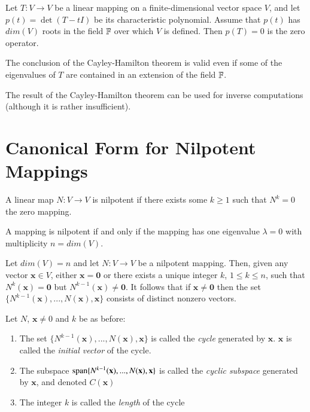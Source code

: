\documentclass[12pt, a4paper, oneside, openright, titlepage]{book}
\newcommand{\mb}[1]{\mathbf{#1}}
\begin{document}
\begin{thm}
    Let $T:V\rightarrow V$ be a linear mapping on a finite-dimensional vector space $V$, and let $p(t) = \det(T- tI)$ be its characteristic polynomial. Assume that $p(t)$ has $dim(V)$ roots in the field $\mathbb F$ over which $V$ is defined. Then $p(T) =0$ is the zero operator.
\end{thm}


\begin{rmk}
    The conclusion of the Cayley-Hamilton theorem is valid even if some of the eigenvalues of $T$ are contained in an extension of the field $\mathbb F$.
\end{rmk}

\begin{rmk}
    The result of the Cayley-Hamilton theorem can be used for inverse computations (although it is rather insufficient).
\end{rmk}

\section{Canonical Form for Nilpotent Mappings}

\begin{defn}
    A linear map $N:V\rightarrow V$ is nilpotent if there exists some $k \geq 1$ such that $N^k = 0$ the zero mapping.
\end{defn}


\begin{lem}
    A mapping is nilpotent if and only if the mapping has one eigenvalue $\lambda = 0$ with multiplicity $n = dim(V)$.
\end{lem}

\begin{rmk}
    Let $dim(V) = n$ and let $N:V\rightarrow V$ be a nilpotent mapping. Then, given any vector $\mb x \in V$, either $\mb x = \mb 0$ or there exists a unique integer $k$, $1 \leq k \leq n$, such that $N^k(\mb x) = \mb 0$ but $N^{k-1}(\mb x) \neq \mb 0$. It follows that if $\mb x \neq \mb 0$ then the set $\{N^{k-1}(\mb x),...,N(\mb x), \mb x\}$ consists of distinct nonzero vectors.
\end{rmk}


\begin{defn}
    Let $N$, $\mb x \neq 0$ and $k$ be as before:
    \begin{enumerate}
        \item The set $\{N^{k-1}(\mb x),...,N(\mb x), \mb x\}$ is called the \emph{cycle} generated by $\mb x$. $\mb x$ is called the \emph{initial vector} of the cycle.
        \item The subspace $\spn\{N^{k-1}(\mb x),...,N(\mb x), \mb x\}$ is called the \emph{cyclic subspace} generated by $\mb x$, and denoted $C(\mb x)$
        \item The integer $k$ is called the \emph{length} of the cycle
    \end{enumerate}
\end{defn}
\end{document}
